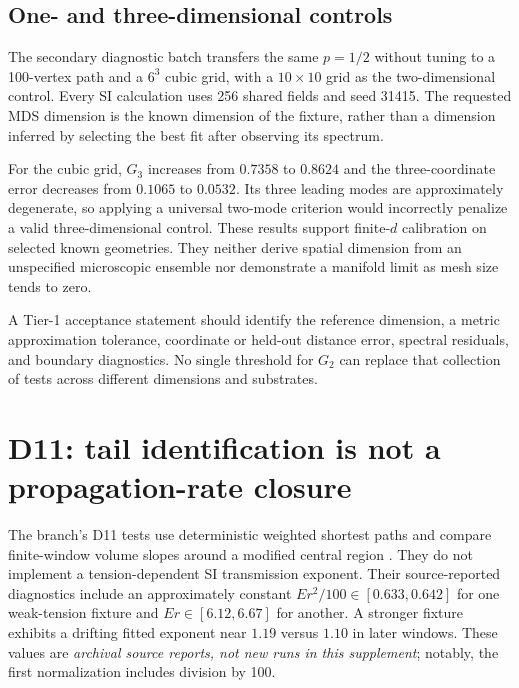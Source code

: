 \documentclass[11pt,letterpaper]{article}
\theoremstyle{definition}
\theoremstyle{remark}
\begin{document}
\subsection{One- and three-dimensional controls}
The secondary diagnostic batch transfers the same $p=1/2$ without tuning to a 100-vertex path and a $6^3$ cubic grid, with a $10\times10$ grid as the two-dimensional control. Every SI calculation uses 256 shared fields and seed 31415. The requested MDS dimension is the known dimension of the fixture, rather than a dimension inferred by selecting the best fit after observing its spectrum.
\begin{table}[htbp]
\centering

\caption{New diagnostic controls in known dimensions. The path is exactly Euclidean for hop distance; a shared-field average remains a path metric and hence exactly one-dimensional, but its sampled edge means need not be perfectly uniform. The cubic grid improves under SI without becoming exactly rank three.}
\label{tab:dimensions}
\end{table}

For the cubic grid, $G_3$ increases from $0.7358$ to $0.8624$ and the three-coordinate error decreases from $0.1065$ to $0.0532$. Its three leading modes are approximately degenerate, so applying a universal two-mode criterion would incorrectly penalize a valid three-dimensional control. These results support finite-$d$ calibration on selected known geometries. They neither derive spatial dimension from an unspecified microscopic ensemble nor demonstrate a manifold limit as mesh size tends to zero.

A Tier-1 acceptance statement should identify the reference dimension, a metric approximation tolerance, coordinate or held-out distance error, spectral residuals, and boundary diagnostics. No single threshold for $G_2$ can replace that collection of tests across different dimensions and substrates.

\section{D11: tail identification is not a propagation-rate closure}\label{sec:d11}
The branch's D11 tests use deterministic weighted shortest paths and compare finite-window volume slopes around a modified central region \cite{leblondDimTests}. They do not implement a tension-dependent SI transmission exponent. Their source-reported diagnostics include an approximately constant $Er^2/100\in[0.633,0.642]$ for one weak-tension fixture and $Er\in[6.12,6.67]$ for another. A stronger fixture exhibits a drifting fitted exponent near $1.19$ versus $1.10$ in later windows. These values are \emph{archival source reports, not new runs in this supplement}; notably, the first normalization includes division by 100.
\end{document}
